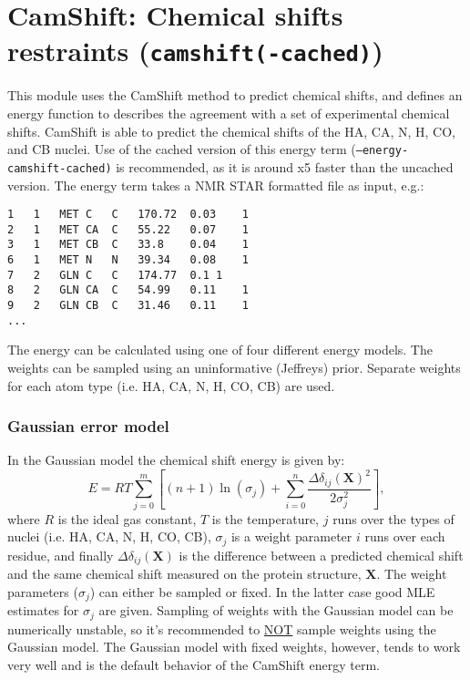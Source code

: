 \section{CamShift: Chemical shifts restraints (\texttt{camshift(-cached)})}
This module uses the CamShift method\cite{CamShift} to predict chemical shifts, and defines an energy function to describes the agreement with a set of experimental chemical shifts. 
CamShift is able to predict the chemical shifts of the HA, CA, N, H, CO, and CB nuclei.
Use of the cached version of this energy term (\texttt{--energy-camshift-cached)} is recommended, as it is around x5 faster than the uncached version.
The energy term takes a NMR STAR formatted file as input, e.g.:
\begin{verbatim}
1	1	MET	C	C	170.72	0.03	1
2	1	MET	CA	C	55.22	0.07	1
3	1	MET	CB	C	33.8	0.04	1
6	1	MET	N	N	39.34	0.08	1
7	2	GLN	C	C	174.77	0.1	1
8	2	GLN	CA	C	54.99	0.11	1
9	2	GLN	CB	C	31.46	0.11	1
...
\end{verbatim}
The energy can be calculated using one of four different energy models. The weights can be sampled using an uninformative (Jeffreys) prior.
Separate weights for each atom type (i.e. HA, CA, N, H, CO, CB) are used.
\subsubsection{Gaussian error model}
In the Gaussian model the chemical shift energy is given by:
\begin{equation}
    E = RT \sum_{j=0}^{m}\left[(n+1) \ln{ \left(\sigma_j \right)} + \sum_{i=0}^{n} \frac{    \Delta\delta_{ij}(\mathbf X)^2}{2\sigma_j^2} \right],
\end{equation}
where $R$ is the ideal gas constant, $T$ is the temperature, $j$ runs over the types of nuclei (i.e. HA, CA, N, H, CO, CB), $\sigma_j$ is a weight parameter
$i$ runs over each residue, and finally $\Delta\delta_{ij}(\mathbf X)$ is the difference between a predicted chemical shift and the same chemical shift measured on the protein structure, $\mathbf X$.
The weight parameters ($\sigma_j$) can either be sampled or fixed.
In the latter case good MLE estimates for $\sigma_j$ are given.
Sampling of weights with the Gaussian model can be numerically unstable, so it's recommended to \underline{NOT} sample weights using the Gaussian model.
The Gaussian model with fixed weights, however, tends to work very well and is the default behavior of the CamShift energy term.

